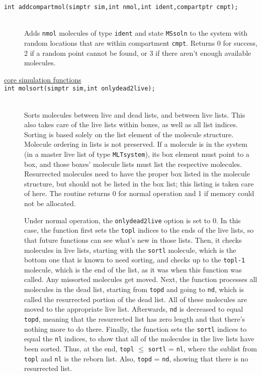 \documentclass {book}
\begin{document}
\begin{description}
\item[\texttt{int addcompartmol(simptr sim,int nmol,int ident,compartptr cmpt);}]
\hfill \\
Adds \texttt{nmol} molecules of type \texttt{ident} and state \texttt{MSsoln} to the system with random locations that are within compartment \texttt{cmpt}. Returns 0 for success, 2 if a random point cannot be found, or 3 if there aren't enough available molecules.

\item[\underline{core simulation functions}]

\item[\texttt{int molsort(simptr sim,int onlydead2live);}]
\hfill \\
Sorts molecules between live and dead lists, and between live lists. This also takes care of the live lists within boxes, as well as all list indices. Sorting is based solely on the list element of the molecule structure. Molecule ordering in lists is not preserved. If a molecule is in the system (in a master live list of type \texttt{MLTsystem}), its box element must point to a box, and those boxes' molecule lists must list the respective molecules. Resurrected molecules need to have the proper box listed in the molecule structure, but should not be listed in the box list; this listing is taken care of here. The routine returns 0 for normal operation and 1 if memory could not be allocated.

Under normal operation, the \texttt{onlydead2live} option is set to 0. In this case, the function first sets the \texttt{topl} indices to the ends of the live lists, so that future functions can see what's new in those lists. Then, it checks molecules in live lists, starting with the \texttt{sortl} molecule, which is the bottom one that is known to need sorting, and checks up to the \texttt{topl-1} molecule, which is the end of the list, as it was when this function was called. Any missorted molecules get moved. Next, the function processes all molecules in the dead list, starting from \texttt{topd} and going to \texttt{nd}, which is called the resurrected portion of the dead list. All of these molecules are moved to the appropriate live list. Afterwards, \texttt{nd} is decreased to equal \texttt{topd}, meaning that the resurrected list has zero length and that there's nothing more to do there. Finally, the function sets the \texttt{sortl} indices to equal the \texttt{nl} indices, to show that all of the molecules in the live lists have been sorted. Thus, at the end, \texttt{topl} $\leq$ \texttt{sortl} = \texttt{nl}, where the sublist from \texttt{topl} and \texttt{nl} is the reborn list. Also, \texttt{topd} = \texttt{nd}, showing that there is no resurrected list.


\end{description}
\end{document}
